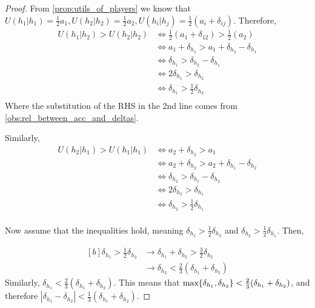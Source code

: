 \begin{proof}
    From \cref{prop:utils_of_players} we know that $U(h_1|h_1) = \frac{1}{2}a_1,U(h_2|h_2) = \frac{1}{2}a_2, U(h_i|h_j) = \frac{1}{2}(a_i + \delta_{ij}) $.
Therefore,
    \begin{equation}
        \begin{aligned}
            U(h_1|h_2) > U(h_2|h_2) &\Leftrightarrow \frac{1}{2}(a_1 + \delta_{12}) > \frac{1}{2}(a_2) \\
            &\Leftrightarrow a_1 + \delta_{h_1} > a_1 + \delta_{h_2} - \delta_{h_1} \\
            &\Leftrightarrow  \delta_{h_1} > \delta_{h_2} - \delta_{h_1} \\
            &\Leftrightarrow  2\delta_{h_1} > \delta_{h_2} \\
            &\Leftrightarrow  \delta_{h_1} > \frac{1}{2}\delta_{h_2} \\
        \end{aligned}
    \end{equation}
    Where the substitution of the RHS in the 2nd line comes from \cref{obs:rel_between_acc_and_deltas}.
    
    Similarly, 
    \begin{equation}
        \begin{aligned}
            U(h_2|h_1) > U(h_1|h_1) &\Leftrightarrow a_2 + \delta_{h_2} > a_1 \\
            &\Leftrightarrow a_2 + \delta_{h_2} > a_2 + \delta_{h_1} - \delta_{h_2} \\
            &\Leftrightarrow  \delta_{h_2} > \delta_{h_1} - \delta_{h_2} \\
            &\Leftrightarrow  2\delta_{h_2} > \delta_{h_1} \\
            &\Leftrightarrow  \delta_{h_2} > \frac{1}{2}\delta_{h_1} \\
        \end{aligned}
    \end{equation}


Now assume that the inequalities hold, meaning $\delta_{h_1} > \frac{1}{2}\delta_{h_2}$ and $\delta_{h_2} > \frac{1}{2}\delta_{h_1}$. Then,

\begin{equation}
    \begin{aligned}[b]
        \delta_{h_1} > \frac{1}{2}\delta_{h_2} &\rightarrow  \delta_{h_1} + \delta_{h_2} > \frac{3}{2}\delta_{h_2} \\
        &\rightarrow  \delta_{h_2} < \frac{2}{3}(\delta_{h_1} + \delta_{h_2}) 
    \end{aligned}
\end{equation}
Similarly, $\delta_{h_1} < \frac{2}{3}(\delta_{h_1} + \delta_{h_2})$. This means that $\text{max} \{\delta_{h_1}, \delta_{h_2}\} < \frac{2}{3}(\delta_{h_1} + \delta_{h_2})$, and therefore $|\delta_{h_1} - \delta_{h_2} |< \frac{1}{3}(\delta_{h_1} + \delta_{h_2})$.


\end{proof}
